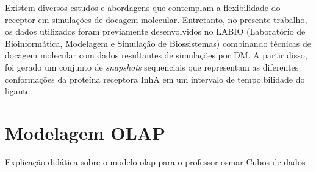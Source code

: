 Existem diversos estudos e abordagens que contemplam a flexibilidade do receptor em simulações de docagem molecular. Entretanto, no presente trabalho, os dados utilizados foram previamente desenvolvidos no LABIO (Laboratório de Bioinformática, Modelagem e Simulação de Biossistemas) combinando técnicas de docagem molecular com dados resultantes de simulações por DM. A partir disso, foi gerado um conjunto de \emph{snapshots} sequenciais que representam as diferentes conformações da proteína receptora InhA em um intervalo de tempo.bilidade do ligante \cite{kar11}.

\section{Modelagem OLAP}
	Explicação didática sobre o modelo olap para o professor osmar
	Cubos de dados  